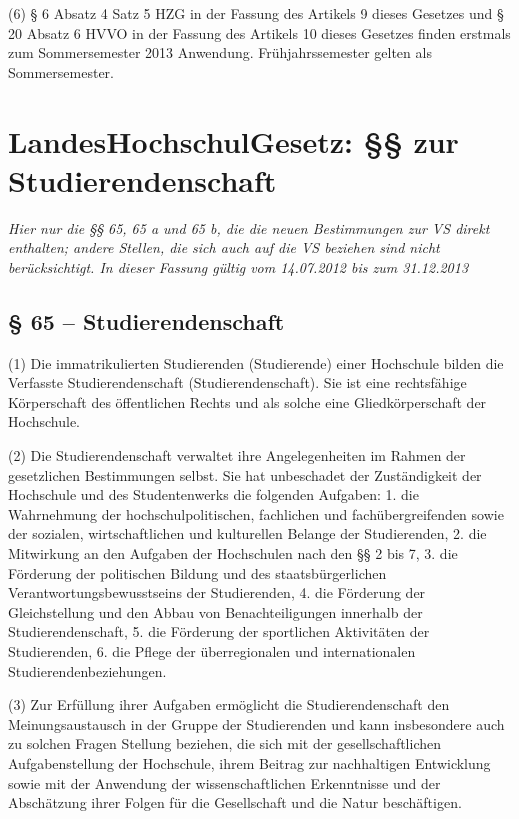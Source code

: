 \documentclass[
10pt,
a4paper,
twoside,								%
titlepage=false,							%
draft=false								%
]{scrartcl}
\begin{document}
(6) § 6 Absatz 4 Satz 5 HZG in der Fassung des Artikels 9 dieses Gesetzes und § 20 Absatz 6 HVVO in der Fassung des Artikels 10 dieses Gesetzes finden erstmals zum Sommersemester 2013 Anwendung. Frühjahrssemester gelten als Sommersemester.




\newpage
\section{LandesHochschulGesetz: §§ zur Studierendenschaft}

\emph{Hier nur die §§ 65, 65 a und 65 b, die die neuen Bestimmungen zur VS direkt enthalten; andere Stellen, die sich auch auf die VS beziehen sind nicht berücksichtigt. In dieser Fassung gültig vom 14.07.2012 bis zum 31.12.2013}

\subsection{§ 65 – Studierendenschaft}

(1) Die immatrikulierten Studierenden (Studierende) einer Hochschule bilden die Verfasste Studierendenschaft (Studierendenschaft). Sie ist eine rechtsfähige Körperschaft des öffentlichen Rechts und als solche eine Gliedkörperschaft der Hochschule.

(2) Die Studierendenschaft verwaltet ihre Angelegenheiten im Rahmen der gesetzlichen Bestimmungen selbst. Sie hat unbeschadet der Zuständigkeit der Hochschule und des Studentenwerks die folgenden Aufgaben:
1. die Wahrnehmung der hochschulpolitischen, fachlichen und fachübergreifenden sowie der sozialen, wirtschaftlichen und kulturellen Belange der Studierenden,
2. die Mitwirkung an den Aufgaben der Hochschulen nach den §§ 2 bis 7,
3. die Förderung der politischen Bildung und des staatsbürgerlichen Verantwortungsbewusstseins der Studierenden,
4. die Förderung der Gleichstellung und den Abbau von Benachteiligungen innerhalb der Studierendenschaft,
5. die Förderung der sportlichen Aktivitäten der Studierenden,
6. die Pflege der überregionalen und internationalen Studierendenbeziehungen.

(3) Zur Erfüllung ihrer Aufgaben ermöglicht die Studierendenschaft den Meinungsaustausch in der Gruppe der Studierenden und kann insbesondere auch zu solchen Fragen Stellung beziehen, die sich mit der gesellschaftlichen Aufgabenstellung der Hochschule, ihrem Beitrag zur nachhaltigen Entwicklung sowie mit der Anwendung der wissenschaftlichen Erkenntnisse und der Abschätzung ihrer Folgen für die Gesellschaft und die Natur beschäftigen.
\end{document}
